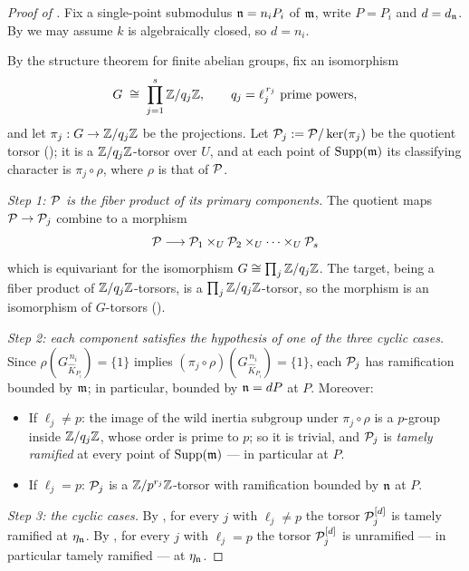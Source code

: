 \begin{proof}[Proof of ]
    Fix a single-point submodulus $\mathfrak{n} = n_i P_i$ of $\mathfrak{m}$, write $P = P_i$
    and $d = d_{\mathfrak{n}}$. By  we may assume
    $k$ is algebraically closed, so $d = n_i$.

    By the structure theorem for finite abelian groups, fix an isomorphism
    \[
        G \;\cong\; \prod_{j=1}^{s} \mathbb{Z}/q_j\mathbb{Z},
        \qquad q_j = \ell_j^{\,r_j} \ \text{prime powers},
    \]
    and let $\pi_j : G \to \mathbb{Z}/q_j\mathbb{Z}$ be the projections. Let
    $\mathcal{P}_j := \mathcal{P} / \ker(\pi_j)$ be the quotient torsor
    (); it is a $\mathbb{Z}/q_j\mathbb{Z}$-torsor over $U$, and at
    each point of $\mathrm{Supp}(\mathfrak{m})$ its classifying character is
    $\pi_j \circ \rho$, where $\rho$ is that of $\mathcal{P}$.

    \emph{Step 1: $\mathcal{P}$ is the fiber product of its primary components.} The
    quotient maps $\mathcal{P} \to \mathcal{P}_j$ combine to a morphism
    \[
        \mathcal{P} \longrightarrow \mathcal{P}_1 \times_U \mathcal{P}_2 \times_U \cdots \times_U \mathcal{P}_s
    \]
    which is equivariant for the isomorphism $G \cong \prod_j \mathbb{Z}/q_j\mathbb{Z}$. The
    target, being a fiber product of $\mathbb{Z}/q_j\mathbb{Z}$-torsors, is a
    $\prod_j \mathbb{Z}/q_j\mathbb{Z}$-torsor, so the morphism is an isomorphism of $G$-torsors
    ().

    \emph{Step 2: each component satisfies the hypothesis of one of the three
    cyclic cases.} Since $\rho(G^{\,n_i}_{\widehat{K}_{P_i}}) = \{1\}$ implies
    $(\pi_j \circ \rho)(G^{\,n_i}_{\widehat{K}_{P_i}}) = \{1\}$, each $\mathcal{P}_j$ has
    ramification bounded by $\mathfrak{m}$; in particular, bounded by $\mathfrak{n} = dP$ at
    $P$. Moreover:
    \begin{itemize}
        \item If $\ell_j \neq p$: the image of the wild inertia subgroup under
        $\pi_j \circ \rho$ is a $p$-group inside $\mathbb{Z}/q_j\mathbb{Z}$, whose order is prime
        to $p$; so it is trivial, and $\mathcal{P}_j$ is \emph{tamely ramified} at every
        point of $\mathrm{Supp}(\mathfrak{m})$ --- in particular at $P$.
        \item If $\ell_j = p$: $\mathcal{P}_j$ is a $\mathbb{Z}/p^{r_j}\mathbb{Z}$-torsor with
        ramification bounded by $\mathfrak{n}$ at $P$.
    \end{itemize}

    \emph{Step 3: the cyclic cases.} By , for
    every $j$ with $\ell_j \neq p$ the torsor $\mathcal{P}_j^{[d]}$ is tamely ramified at
    $\eta_{\mathfrak{n}}$. By ,
    for every $j$ with $\ell_j = p$ the torsor $\mathcal{P}_j^{[d]}$ is unramified ---
    in particular tamely ramified --- at $\eta_{\mathfrak{n}}$.


\end{proof}
